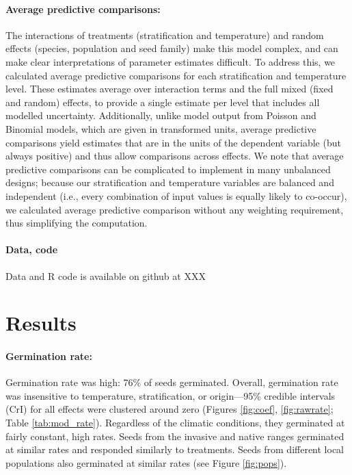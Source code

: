 \documentclass[12pt]{article}\usepackage[]{graphicx}\usepackage[]{color}
\begin{document}
	\paragraph{Average predictive comparisons:} The interactions of treatments (stratification and temperature) and random effects (species, population and seed family) make this model complex, and can make clear interpretations of parameter estimates difficult. To address this, we calculated average predictive comparisons \parencite{Gelman2007} for each stratification and  temperature level. These estimates average over interaction terms and the full mixed (fixed and random) effects, to provide a single estimate per level that includes all modelled uncertainty. Additionally, unlike model output from Poisson and Binomial models, which are given in transformed units, average predictive comparisons yield estimates that are in the units of the dependent variable (but always positive) \parencite{Gelman2007} and thus allow comparisons across effects. We note that average predictive comparisons can be complicated to implement in many unbalanced designs; because our stratification and temperature variables are balanced and independent (i.e., every combination of input values is equally likely to co-occur), we calculated average predictive comparison without any weighting requirement, thus simplifying the computation. 
	
	\paragraph{Data, code} 
	Data and R code is available on github at XXX
	\section{Results} 
	\paragraph{Germination rate:} Germination rate was high: 76\% of seeds germinated. Overall, germination rate was insensitive to temperature, stratification, or origin---95\% credible intervals (CrI) for all effects were clustered around zero (Figures \ref{fig:coef}, \ref{fig:rawrate}; Table \ref{tab:mod_rate}). Regardless of the climatic conditions, they germinated at fairly constant, high rates. Seeds from the invasive and native ranges germinated at similar rates and responded similarly to treatments. Seeds from different local populations also germinated at similar rates (see Figure \ref{fig:pops}).
\end{document}
